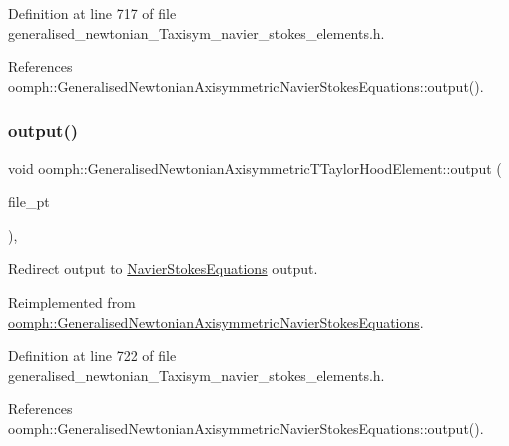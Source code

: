 Definition at line 717 of file generalised\+\_\+newtonian\+\_\+\+Taxisym\+\_\+navier\+\_\+stokes\+\_\+elements.\+h.



References oomph\+::\+Generalised\+Newtonian\+Axisymmetric\+Navier\+Stokes\+Equations\+::output().

\mbox{\label{classoomph_1_1GeneralisedNewtonianAxisymmetricTTaylorHoodElement_aedc97079cc4048b5467c5010f53ebc07}} 
\subsubsection{\texorpdfstring{output()}{output()}\hspace{0.1cm}{\footnotesize\ttfamily [3/4]}}
{\footnotesize\ttfamily void oomph\+::\+Generalised\+Newtonian\+Axisymmetric\+T\+Taylor\+Hood\+Element\+::output (\begin{DoxyParamCaption}\item[{F\+I\+LE $\ast$}]{file\+\_\+pt }\end{DoxyParamCaption})\hspace{0.3cm}{\ttfamily [inline]}, {\ttfamily [virtual]}}



Redirect output to \hyperlink{classoomph_1_1NavierStokesEquations}{Navier\+Stokes\+Equations} output. 



Reimplemented from \hyperlink{classoomph_1_1GeneralisedNewtonianAxisymmetricNavierStokesEquations_a34a51e3ad73df1ddca173e59a1404c90}{oomph\+::\+Generalised\+Newtonian\+Axisymmetric\+Navier\+Stokes\+Equations}.



Definition at line 722 of file generalised\+\_\+newtonian\+\_\+\+Taxisym\+\_\+navier\+\_\+stokes\+\_\+elements.\+h.



References oomph\+::\+Generalised\+Newtonian\+Axisymmetric\+Navier\+Stokes\+Equations\+::output().

\mbox{\label{classoomph_1_1GeneralisedNewtonianAxisymmetricTTaylorHoodElement_a52f26763af5a245e6bd5b578abf16095}} 
